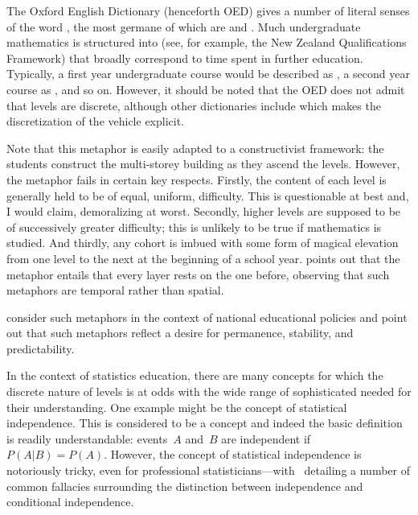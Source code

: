 The Oxford English Dictionary (henceforth OED) gives a number of
literal senses of the word , the most germane of which
are  and .  Much undergraduate mathematics is structured into
 (see, for example, the New Zealand Qualifications
Framework) that broadly correspond to time spent in further education.
Typically, a first year undergraduate course would be described as
, a second year course as , and so on.
However, it should be noted that the OED does not admit that levels
are discrete, although other dictionaries include  which makes the discretization of
the vehicle explicit.

Note that this metaphor is easily adapted to a constructivist
framework: the students construct the multi-storey building as they
ascend the levels.  However, the metaphor fails in certain key
respects.  Firstly, the content of each level is generally held to be
of equal, uniform, difficulty.  This is questionable at best and, I
would claim, demoralizing at worst.  Secondly, higher levels are
supposed to be of successively greater difficulty; this is unlikely to
be true if  mathematics is studied.  And thirdly,
any cohort is imbued with some form of magical elevation from one
level to the next at the beginning of a school year.
 points out that the  metaphor
entails that every layer rests on the one before, observing that such
metaphors are temporal rather than spatial.

 consider such metaphors in the context of national
educational policies and point out that such metaphors reflect a
desire for permanence, stability, and predictability.

In the context of statistics education, there are many concepts for
which the discrete nature of levels is at odds with the wide range of
sophisticated needed for their understanding.  One example might be
the concept of statistical independence.  This is considered to be a
 concept and indeed the basic definition is readily
understandable: events~$A$ and~$B$ are independent
if~$P\left(A\left|B\right.\right)=P\left(A\right)$.  However, the
concept of statistical independence is notoriously tricky, even for
professional statisticians---with~ detailing a
number of common fallacies surrounding the distinction between
independence and conditional independence.

